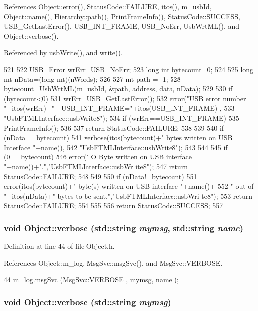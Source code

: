 References Object::error(), StatusCode::FAILURE, itos(), m\_\-usbId, Object::name(), Hierarchy::path(), PrintFrameInfo(), StatusCode::SUCCESS, USB\_\-GetLastError(), USB\_\-INT\_\-FRAME, USB\_\-NoErr, UsbWrtML(), and Object::verbose().

Referenced by usbWrite(), and write().


\begin{DoxyCode}
521                                                              {
522   USB_Error wrErr=USB_NoErr;
523   long int  bytecount=0;
524 
525   long int nData=(long int)(nWords);
526 
527   int path = -1;
528   bytecount=UsbWrtML(m_usbId, &path, address, data, nData);
529 
530   if (bytecount<0){
531     wrErr=USB_GetLastError();
532     error("USB error number "+itos(wrErr)+" - USB_INT_FRAME="+itos(USB_INT_FRAME)
      ,
533             "UsbFTMLInterface::usbWrite8");
534     if (wrErr==USB_INT_FRAME){
535       PrintFrameInfo();
536     } 
537     return StatusCode::FAILURE;
538   }
539 
540   if (nData==bytecount){
541     verbose(itos(bytecount)+" bytes written on USB Interface "+name(),
542             "UsbFTMLInterface::usbWrite8");
543   }
544   
545   if (0==bytecount){
546     error(" O Byte written on USB interface "+name()+".","UsbFTMLInterface::usbWr
      ite8");
547     return StatusCode::FAILURE;
548   }
549 
550   if (nData!=bytecount){
551     error(itos(bytecount)+" byte(s) written on USB interface "+name()+
552             " out of "+itos(nData)+" bytes to be sent.","UsbFTMLInterface::usbWri
      te8");
553     return StatusCode::FAILURE;    
554   }
555 
556   return StatusCode::SUCCESS;  
557 }
\end{DoxyCode}
\hypertarget{classObject_a2d4120195317e2a3c6532e8bb9f3da68}{
\subsubsection[{verbose}]{\setlength{\rightskip}{0pt plus 5cm}void Object::verbose (std::string {\em mymsg}, \/  std::string {\em name})}}
\label{classObject_a2d4120195317e2a3c6532e8bb9f3da68}


Definition at line 44 of file Object.h.

References Object::m\_\-log, MsgSvc::msgSvc(), and MsgSvc::VERBOSE.


\begin{DoxyCode}
44 { m_log.msgSvc (MsgSvc::VERBOSE , mymsg, name ); }
\end{DoxyCode}
\hypertarget{classObject_a83d2db2df682907ea1115ad721c1c4a1}{
\subsubsection[{verbose}]{\setlength{\rightskip}{0pt plus 5cm}void Object::verbose (std::string {\em mymsg})}}
\label{classObject_a83d2db2df682907ea1115ad721c1c4a1}


